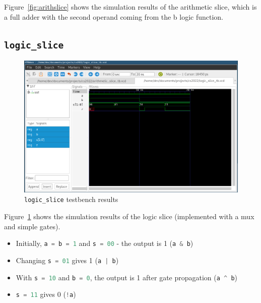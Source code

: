 \documentclass[a4paper]{article}
\numberwithin{figure}{section}
\numberwithin{table}{section}
\newcommand{\mi}{\mintinline}
\begin{document}
Figure~\ref{fig:arithslice} shows the simulation results of the arithmetic slice, which is a 
full adder with the second operand coming from the b logic function.

\newpage
\subsection{\mi{c}{logic_slice}}
\begin{figure}[h!]
	\centering
	\includegraphics[width=\textwidth]{logic_slice_tb}
	\caption{\mi{c}{logic_slice} testbench results}
	\label{fig:logicslice}
\end{figure}

Figure~\ref{fig:logicslice} shows the simulation results of the logic slice (implemented with a mux and simple gates).
\begin{itemize}
	\item Initially, \mi{c}{a = b = 1} and \mi{c}{s = 00} - the output is 1 (\mi{c}{a & b})
	\item Changing \mi{c}{s = 01} gives 1 (\mi{c}{a | b})
	\item With \mi{c}{s = 10} and \mi{c}{b = 0}, the output is 1 after gate propagation (\mi{c}{a ^ b})
	\item \mi{c}{s = 11} gives 0 (\mi{c}{!a})
\end{itemize}

\newpage
\end{document}
